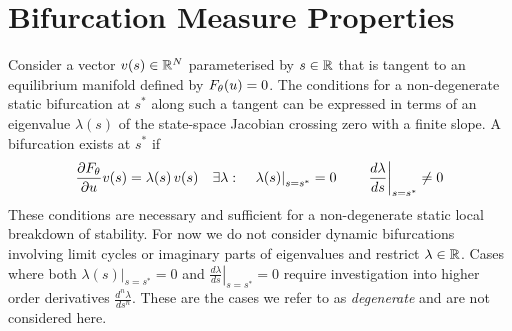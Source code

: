\clearpage
\section{Bifurcation Measure Properties}
\label{appendix:conditions}
Consider a vector $v(s)\in\mathbb{R}^N$ parameterised by $s\in\mathbb{R}$ that is tangent to an equilibrium manifold defined by $F_{\theta}(u)=0$. The conditions for a non-degenerate static bifurcation at $s^*$ along such a tangent can be expressed in terms of an eigenvalue $\lambda(s)$ of the state-space Jacobian crossing zero with a finite slope. A bifurcation exists at $s^*$ if
\begin{align}
    \frac{\partial F_{\theta}}{\partial u}v(s)=\lambda(s) \,v(s)
    \quad\exists\lambda:\quad
    \left.\lambda(s)\right|_{s=s^*}=0
    \qquad
    \left.\frac{d\lambda}{ds}\right|_{s=s^*}\neq 0
    \label{eq:conditions}
\end{align}
These conditions are necessary and sufficient for a non-degenerate static local breakdown of stability. For now we do not consider dynamic bifurcations involving limit cycles or imaginary parts of eigenvalues and restrict $\lambda\in\mathbb{R}$. Cases where both $\left.\lambda(s)\right|_{s=s^*}=0$ and $\left.\frac{d\lambda}{ds}\right|_{s=s^*}=0$ require investigation into higher order derivatives $\frac{d^n\lambda}{ds^n}$. These are the cases we refer to as \emph{degenerate} and are not considered here.

